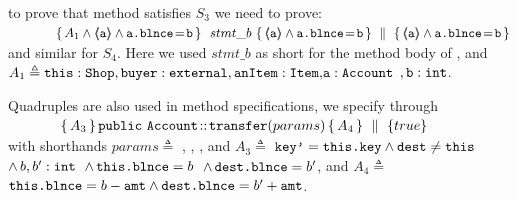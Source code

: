 \vspace{.1cm}
\Eg to prove  that method  satisfies  {$S_3$}  we  need to prove:
\\
$\strut \ \ \ \ \ \  \ \  \ \ \   \quadruple {A_1  \wedge  \inside{\prg{a}} \wedge  \prg{a.\balance}\!=\!{\prg{b}} } {\   stmt\_b  \  } {\inside{\prg{a}} \wedge  \prg{a.\balance}\!=\!\prg{b}}   
                         {  \inside{\prg{a}} \wedge  \prg{a.\balance}\!=\!\prg{b} }$
\\
and similar for {$S_4$}. Here we used   $stmt\_b$  as short for the method body of , and $A_1 \triangleq \prg{this}:\prg{Shop}, \prg{buyer}:\prg{external}, \prg{anItem}:\prg{Item}{,}\prg{a}:\prg{Account}$
$, \prg{b}:\prg{int}$.
 
 \vspace{.2cm}
Quadruples are also used in method specifications, \eg we specify  through
\\
$\strut \ \ \ \ \ \  \ \  \ \ \  { \mprepostLongN {A_3}{\prg{public}\ \prg{Account}}{\prg{transfer}}{params}{A_4} {true} }$
\\
with shorthands  $params \triangleq$ , , , and 
$A_3  \triangleq$  $\prg{key'}=\prg{this.\password} \wedge \prg{dest}\neq \prg{this}$
$\wedge\, b, b':\prg{int}$
$\, \wedge\, \prg{this.\balance}=b$ 
$\, \wedge\,  \prg{dest.\balance}=b'$, 
 and $A_4 \triangleq$  
 $\prg{this.\balance}=b-\prg{amt} \wedge \prg{dest.\balance}=b'+\prg{amt}$.

